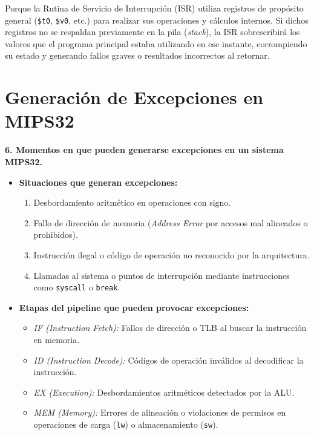 \documentclass[12pt,a4paper]{article}
\begin{document}
Porque la Rutina de Servicio de Interrupción (ISR) utiliza registros de propósito general (\texttt{\$t0}, \texttt{\$v0}, etc.) para realizar sus operaciones y cálculos internos. Si dichos registros no se respaldan previamente en la pila (\textit{stack}), la ISR sobrescribirá los valores que el programa principal estaba utilizando en ese instante, corrompiendo su estado y generando fallos graves o resultados incorrectos al retornar. 


\section{Generación de Excepciones en MIPS32} 
\textbf{6. Momentos en que pueden generarse excepciones en un sistema MIPS32.} 

\begin{itemize}
    \item[a)] \textbf{Situaciones que generan excepciones:} 
    \begin{enumerate}
        \item Desbordamiento aritmético en operaciones con signo. 
        \item Fallo de dirección de memoria (\textit{Address Error} por accesos mal alineados o prohibidos).
        \item Instrucción ilegal o código de operación no reconocido por la arquitectura. 
        \item Llamadas al sistema o puntos de interrupción mediante instrucciones como \texttt{syscall} o \texttt{break}.
        \end{enumerate}
    
    \item[b)] \textbf{Etapas del pipeline que pueden provocar excepciones:} 
    \begin{itemize}
        \item \textit{IF (Instruction Fetch):} Fallos de dirección o TLB al buscar la instrucción en memoria. 
        \item \textit{ID (Instruction Decode):} Códigos de operación inválidos al decodificar la instrucción. 
        \item \textit{EX (Execution):} Desbordamientos aritméticos detectados por la ALU.
        \item \textit{MEM (Memory):} Errores de alineación o violaciones de permisos en operaciones de carga (\texttt{lw}) o almacenamiento (\texttt{sw}). 
    \end{itemize}
\end{itemize}
\end{document}

